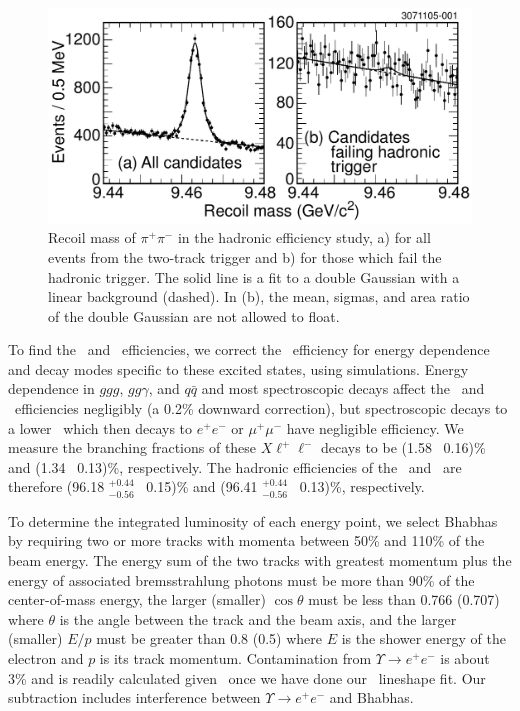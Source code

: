 \documentclass[aps,prl,twocolumn,superscriptaddress,showpacs]{revtex4}
\begin{document}
\begin{figure}
  \includegraphics[width=\linewidth]{cascades}
  \caption{\label{fig:cascades} Recoil mass of $\pi^+\pi^-$ in the
  hadronic efficiency study, a) for all events from the two-track
  trigger and b) for those which fail the hadronic trigger.  The solid
  line is a fit to a double Gaussian with a linear background
  (dashed).  In (b), the mean, sigmas, and area ratio of the double
  Gaussian are not allowed to float.}
\end{figure}

To find the \uss\ and \usss\ efficiencies, we correct the \us\
efficiency for energy dependence and decay modes specific to these
excited states, using simulations.  Energy dependence in $ggg$,
$gg\gamma$, and $q\bar{q}$ and most spectroscopic decays affect the
\uss\ and \usss\ efficiencies negligibly (a 0.2\% downward
correction), but spectroscopic decays to a lower \ups\ which then
decays to $e^+e^-$ or $\mu^+\mu^-$ have negligible efficiency.  We
measure the branching fractions of these $X\ell^+\ell^-$ decays to be
(1.58 \PM\ 0.16)\% and (1.34 \PM\ 0.13)\%, respectively.  The hadronic
efficiencies of the \uss\ and \usss\ are therefore (96.18
$^{+0.44}_{-0.56}$ \PM\ 0.15)\% and (96.41 $^{+0.44}_{-0.56}$ \PM\
0.13)\%, respectively.

To determine the integrated luminosity of each energy point, we select
Bhabhas by requiring two or more tracks with momenta between 50\% and
110\% of the beam energy.  The energy sum of the two tracks with greatest
momentum plus the energy of associated bremsstrahlung photons must be
more than 90\% of the center-of-mass energy, the larger (smaller)
$\cos \theta$ must be less than 0.766 (0.707) where $\theta$ is the
angle between the track and the beam axis, and the larger (smaller)
$E/p$ must be greater than 0.8 (0.5) where $E$ is the shower energy
of the electron and $p$ is its track momentum.  Contamination from
$\Upsilon \to e^+e^-$ is about 3\% and is readily calculated given
\bmm\ once we have done our \ups\ lineshape fit.  Our subtraction
includes interference between $\Upsilon \to e^+e^-$ and Bhabhas.
\end{document}
